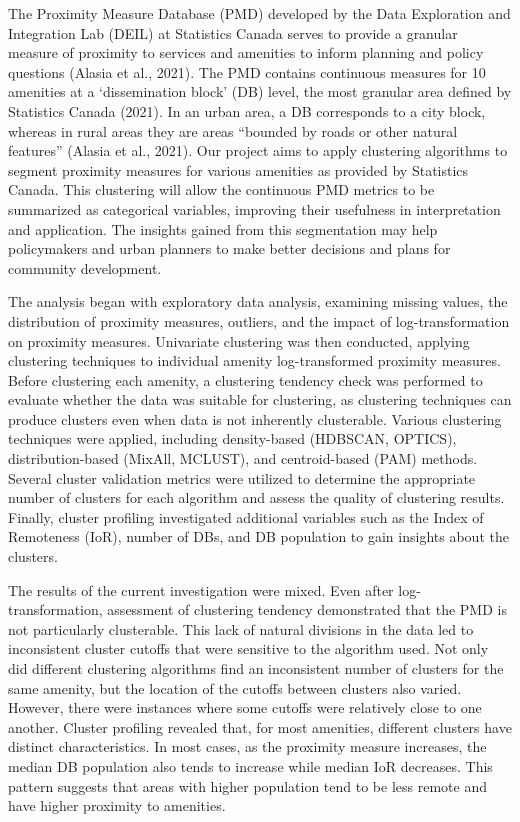 \documentclass[11pt, a4paper]{article}
\begin{document}
\normalsize
The Proximity Measure Database (PMD) developed by the Data Exploration and Integration Lab (DEIL) at Statistics Canada serves to provide a granular measure of proximity to services and amenities to inform planning and policy questions (Alasia et al., 2021). The PMD contains continuous measures for 10 amenities at a `dissemination block' (DB) level, the most granular area defined by Statistics Canada (2021). In an urban area, a DB corresponds to a city block, whereas in rural areas they are areas “bounded by roads or other natural features” (Alasia et al., 2021). Our project aims to apply clustering algorithms to segment proximity measures for various amenities as provided by Statistics Canada. This clustering will allow the continuous PMD metrics to be summarized as categorical variables, improving their usefulness in interpretation and application. The insights gained from this segmentation may help policymakers and urban planners to make better decisions and plans for community development.
\par
\hspace{1pc} The analysis began with exploratory data analysis, examining missing values, the distribution of proximity measures, outliers, and the impact of log-transformation on proximity measures. Univariate clustering was then conducted, applying clustering techniques to individual amenity log-transformed proximity measures. Before clustering each amenity, a clustering tendency check was performed to evaluate whether the data was suitable for clustering, as clustering techniques can produce clusters even when data is not inherently clusterable. Various clustering techniques were applied, including density-based (HDBSCAN, OPTICS), distribution-based (MixAll, MCLUST), and centroid-based (PAM) methods. Several cluster validation metrics were utilized to determine the appropriate number of clusters for each algorithm and assess the quality of clustering results. Finally, cluster profiling investigated additional variables such as the Index of Remoteness (IoR), number of DBs, and DB population to gain insights about the clusters.
\par
\hspace{1pc} The results of the current investigation were mixed. Even after log-transformation, assessment of clustering tendency demonstrated that the PMD is not particularly clusterable. This lack of natural divisions in the data led to inconsistent cluster cutoffs that were sensitive to the algorithm used. Not only did different clustering algorithms find an inconsistent number of clusters for the same amenity, but the location of the cutoffs between clusters also varied. However, there were instances where some cutoffs were relatively close to one another. Cluster profiling revealed that, for most amenities, different clusters have distinct characteristics. In most cases, as the proximity measure increases, the median DB population also tends to increase while median IoR decreases. This pattern suggests that areas with higher population tend to be less remote and have higher proximity to amenities.
\end{document}
